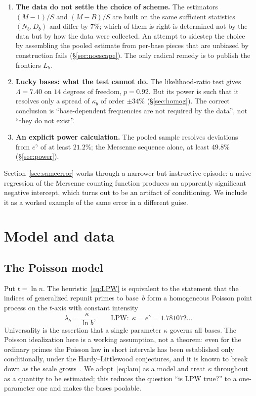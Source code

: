 \documentclass[11pt,a4paper]{article}
\theoremstyle{plain}
\theoremstyle{remark}
\newcommand{\eg}{e^{\gamma}}
\begin{document}
\begin{enumerate}
\item\textbf{The data do not settle the choice of scheme.} The estimators
$(M-1)/S$ and $(M-B)/S$ are built on the same sufficient statistics $(N_b,D_b)$
and differ by $7\%$; which of them is right is determined not by the data but by
how the data were collected. An attempt to sidestep the choice by assembling the
pooled estimate from per-base pieces that are unbiased by construction fails
(\S\ref{sec:noescape}). The only radical remedy is to publish the frontiers
$L_b$.

\item\textbf{Lucky bases: what the test cannot do.} The likelihood-ratio test
gives $\Lambda=7.40$ on $14$ degrees of freedom, $p=0.92$. But its power is such
that it resolves only a spread of $\kappa_b$ of order $\pm34\%$
(\S\ref{sec:homog}). The correct conclusion is ``base-dependent frequencies are
not required by the data'', not ``they do not exist''.

\item\textbf{An explicit power calculation.} The pooled sample resolves
deviations from $\eg$ of at least $21.2\%$; the Mersenne sequence alone, at
least $49.8\%$ (\S\ref{sec:power}).
\end{enumerate}

Section~\ref{sec:sameerror} works through a narrower but instructive episode: a
naive regression of the Mersenne counting function produces an apparently
significant negative intercept, which turns out to be an artifact of
conditioning. We include it as a worked example of the same error in a different
guise.

\section{Model and data}\label{sec:data}

\subsection{The Poisson model}
Put $t=\ln n$. The heuristic~\eqref{eq:LPW} is equivalent to the statement that
the indices of generalized repunit primes to base~$b$ form a homogeneous Poisson
point process on the $t$-axis with constant intensity
\begin{equation}\label{eq:lam}
\lambda_b=\frac{\kappa}{\ln b},\qquad \text{LPW:}\ \ \kappa=\eg=1.781072\ldots
\end{equation}
Universality is the assertion that a single parameter $\kappa$ governs all
bases. The Poisson idealization here is a working assumption, not a theorem:
even for the ordinary primes the Poisson law in short intervals has been
established only conditionally, under the Hardy--Littlewood conjectures, and it
is known to break down as the scale grows~\cite{jha2026}. We adopt~\eqref{eq:lam}
as a model and treat $\kappa$ throughout as a quantity to be estimated; this
reduces the question ``is LPW true?'' to a one-parameter one and makes the bases
poolable.
\end{document}
